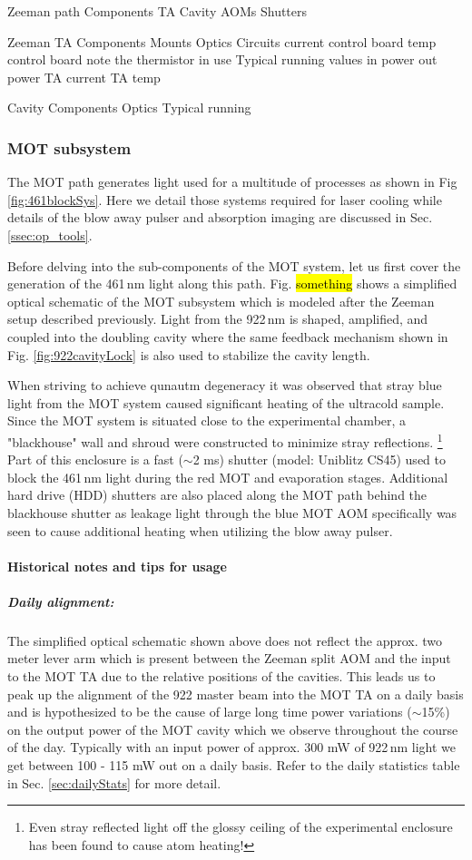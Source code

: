 Zeeman path
	Components
		TA
		Cavity
		AOMs
		Shutters
	
	Zeeman TA
		Components
			Mounts
			Optics
			Circuits
				current control board
				temp control board
					note the thermistor in use
		Typical running values
			in power
			out power
			TA current
			TA temp
		
	Cavity
		Components
			Optics
		Typical running
		
\subsubsection{MOT subsystem}

The MOT path generates light used for a multitude of processes as shown in Fig \ref{fig:461blockSys}.
Here we detail those systems required for laser cooling while details of the blow away pulser and absorption imaging are discussed in Sec. \ref{ssec:op_tools}.

Before delving into the sub-components of the MOT system, let us first cover the generation of the 461\,nm light along this path.
Fig. \hl{something} shows a simplified optical schematic of the MOT subsystem which is modeled after the Zeeman setup described previously.
Light from the 922\,nm is shaped, amplified, and coupled into the doubling cavity where the same feedback mechanism shown in Fig. \ref{fig:922cavityLock} is also used to stabilize the cavity length.

When striving to achieve qunautm degeneracy it was observed that stray blue light from the MOT system caused significant heating of the ultracold sample. 
Since the MOT system is situated close to the experimental chamber, a "blackhouse" wall and shroud were constructed to minimize stray reflections.
\footnote{Even stray reflected light off the glossy ceiling of the experimental enclosure has been found to cause atom heating!}
Part of this enclosure is a fast ($\sim$2 ms) shutter (model: Uniblitz CS45) used to block the 461\,nm light during the red MOT and evaporation stages.
Additional hard drive (HDD) shutters are also placed along the MOT path behind the blackhouse shutter as leakage light through the blue MOT AOM specifically was seen to cause additional heating when utilizing the blow away pulser.

\paragraph{Historical notes and tips for usage}
\subparagraph{Daily alignment:}
The simplified optical schematic shown above does not reflect the approx. two meter lever arm which is present between the Zeeman split AOM and the input to the MOT TA due to the relative positions of the cavities.
This leads us to peak up the alignment of the 922 master beam into the MOT TA on a daily basis and is hypothesized to be the cause of large long time power variations ($\sim$15\%) on the output power of the MOT cavity which we observe throughout the course of the day.
Typically with an input power of approx. 300 mW of 922\,nm light we get between 100 - 115 mW out on a daily basis.
Refer to the daily statistics table in Sec. \ref{sec:dailyStats} for more detail.

